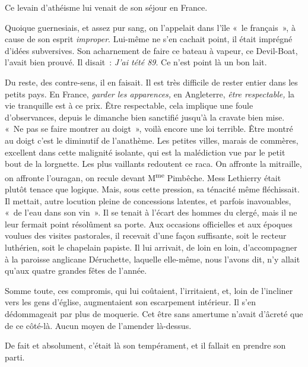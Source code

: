 \documentclass[french,twoside]{book} %
\begin{document}
Ce levain d’athéisme lui venait de son séjour en France.\par
Quoique guernesiais, et assez pur sang, on l’appelait dans l’île « le français », à cause de son esprit \emph{improper}. Lui-même ne s’en cachait point, il était imprégné d’idées subversives. Son acharnement de faire ce bateau à vapeur, ce Devil-Boat, l’avait bien prouvé. Il disait : \emph{J’ai tété 89}. Ce n’est point là un bon lait.\par
Du reste, des contre-sens, il en faisait. Il est très difficile de rester entier dans les petits pays. En France, \emph{garder les apparences,} en Angleterre, \emph{être respectable,} la vie tranquille est à ce prix. Être respectable, cela implique une foule d’observances, depuis le dimanche bien sanctifié jusqu’à la cravate bien mise.  « Ne pas se faire montrer au doigt », voilà encore une loi terrible. Être montré au doigt c’est le diminutif de l’anathème. Les petites villes, marais de commères, excellent dans cette malignité isolante, qui est la malédiction vue par le petit bout de la lorgnette. Les plus vaillants redoutent ce raca. On affronte la mitraille, on affronte l’ouragan, on recule devant M\textsuperscript{me} Pimbêche. Mess Lethierry était plutôt tenace que logique. Mais, sous cette pression, sa ténacité même fléchissait. Il mettait, autre locution pleine de concessions latentes, et parfois inavouables, « de l’eau dans son vin ». Il se tenait à l’écart des hommes du clergé, mais il ne leur fermait point résolûment sa porte. Aux occasions officielles et aux époques voulues des visites pastorales, il recevait d’une façon suffisante, soit le recteur luthérien, soit le chapelain papiste. Il lui arrivait, de loin en loin, d’accompagner à la paroisse anglicane Déruchette, laquelle elle-même, nous l’avons dit, n’y allait qu’aux quatre grandes fêtes de l’année.\par
Somme toute, ces compromis, qui lui coûtaient, l’irritaient, et, loin de l’incliner vers les gens d’église, augmentaient son escarpement intérieur. Il s’en dédommageait par plus de moquerie. Cet être sans amertume n’avait d’âcreté que de ce côté-là. Aucun moyen de l’amender là-dessus.\par
De fait et absolument, c’était là son tempérament, et il fallait en prendre son parti.\par
\end{document}
